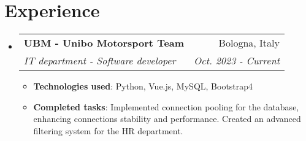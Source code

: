 \documentclass[letterpaper,11pt]{article}
\makeatletter
\newcommand{\resumeItem}[2]{
  \item\small{
    \textbf{#1}{: #2 \vspace{-2pt}}
  }
}
\newcommand{\resumeSubheading}[4]{
  \vspace{-1pt}\item
    \begin{tabular*}{0.97\textwidth}{l@{\extracolsep{\fill}}r}
      \textbf{#1} & #2 \\
      \textit{\small#3} & \textit{\small #4} \\
    \end{tabular*}\vspace{-5pt}
}
\newcommand{\resumeSubHeadingListStart}{\begin{itemize}[leftmargin=*]}
\newcommand{\resumeSubHeadingListEnd}{\end{itemize}}
\newcommand{\resumeItemListStart}{\begin{itemize}}
\newcommand{\resumeItemListEnd}{\end{itemize}\vspace{-5pt}}
\makeatother
\begin{document}
\section{Experience}
\resumeSubHeadingListStart
    \resumeSubheading{UBM - Unibo Motorsport Team}{Bologna, Italy}{IT department - Software developer}{Oct. 2023 - Current}
    \resumeItemListStart
        \resumeItem{Technologies used} {Python, Vue.js, MySQL, Bootstrap4}
        \resumeItem{Completed tasks}
        {Implemented connection pooling for the database, enhancing connections stability and performance. Created an advanced filtering system for the HR department.}
    \resumeItemListEnd
\resumeSubHeadingListEnd
\begin{comment}

  \resumeSubHeadingListStart
    
    \resumeSubheading
      {UBM - Unibo Motorsport Team}{Bologna, Italy}
      {Software developer}{Oct. 2023 - Current}
      \resumeItemListStart
        \resumeItem{Python}
          {I improved the back-end of the application, implementing new features, 
            documenting the code and fixing bugs.
            In particular:}
            \resumeItemListStart
                \resumeItem{Connection pooling}
                    {I implemented a connection pool to the database, to avoid the overhead of creating a new connection every time a request is made.}
            \resumeItemListEnd
      \resumeItemListEnd

  
    \resumeSubheading
      {Other Company}{Location}
      {Position}{From - To}
      \resumeItemListStart
        \resumeItem{Technology you worked with/on}
          {Description}
        \resumeItem{Other technology you worked with/on}
          {Description}
      \resumeItemListEnd

    \resumeSubheading
      {Research Position}{Location}
      {Position}{From - To}
      \resumeItemListStart
        \resumeItem{Technology you worked with/on}
          {Description}
        \resumeItem{Other technology you worked with/on}
          {Description}
      \resumeItemListEnd

  \resumeSubHeadingListEnd
\end{comment}

\begin{comment}
\section{Languages}
    \resumeSubHeadingListStart
    \resumeItem
      {Italian}{Native speaker}
    \resumeItem
      {English}{Level C1}
  \resumeSubHeadingListEnd
\end{comment}
\end{document}
